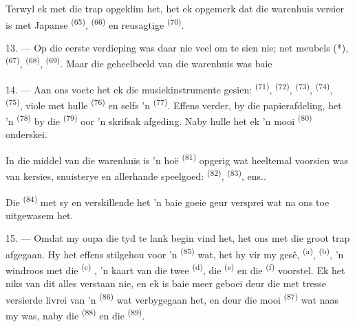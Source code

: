 Terwyl ek met die trap opgeklim het, het ek opgemerk dat die warenhuis versier is met
Japanse  \textsuperscript{(65)}, 
\textsuperscript{(66)} en reusagtige  \textsuperscript{(70)}.

13. --- Op die eerste verdieping was daar nie veel om te sien nie; net meubels (*),
 \textsuperscript{(67)},  \textsuperscript{(68)},
 \textsuperscript{(69)}. Maar die geheelbeeld van die warenhuis
was baie 

14. --- Aan ons voete het ek die musiekinstrumente gesien: 
\textsuperscript{(71)},  \textsuperscript{(72)}, 
\textsuperscript{(73)},  \textsuperscript{(74)},
 \textsuperscript{(75)}, viole met hulle 
\textsuperscript{(76)} en selfs 'n  \textsuperscript{(77)}. Effens
verder, by die papierafdeling, het 'n  \textsuperscript{(78)} by die
 \textsuperscript{(79)} oor 'n skrifsak afgeding. Naby hulle het
ek 'n mooi  \textsuperscript{(80)} onderskei.

In die middel van die warenhuis is 'n hoë  \textsuperscript{(81)}
opgerig wat heeltemal voorsien was van kersies, snuisterye en allerhande speelgoed:
 \textsuperscript{(82)},  \textsuperscript{(83)}, ens..

Die  \textsuperscript{(84)} met sy  en
verskillende  het 'n baie goeie geur versprei wat na ons toe uitgewasem
het.

\VUsaut{3.4mm}
\VUsaut{2.8mm}

15. --- Omdat my oupa die tyd te lank begin vind het, het ons met die groot trap
afgegaan. Hy het effens stilgehou voor 'n 
\textsuperscript{(85)} wat, het hy vir my gesê,  \textsuperscript{(a)},
 \textsuperscript{(b)}, 'n windroos met die  \textsuperscript{(c)} , 'n kaart van die
twee  \textsuperscript{(d)}, die 
\textsuperscript{(e)} en die  \textsuperscript{(f)} voorstel. Ek het
niks van dit alles verstaan nie, en ek is baie meer geboei deur die met tresse versierde
livrei van 'n  \textsuperscript{(86)} wat verbygegaan het, en deur die
mooi  \textsuperscript{(87)} wat naas my was, naby die 
\textsuperscript{(88)} en die  \textsuperscript{(89)}.

